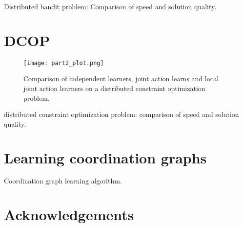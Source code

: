 \documentclass[a4paper, 12pt]{article}
\begin{document}
\begin{table*}[tp]
  \centering
  
  \caption{Distributed bandit problem: Comparison of speed and solution quality.}
  \label{tab:part1}
\end{table*}


\section{DCOP}

\begin{figure*}[tp]
  \centering
  \texttt{[image: part2\_plot.png]}
  \caption{Comparison of independent learners, joint action learns and local joint action learners on a distributed constraint optimization problem.}
  \label{fig:part2}
\end{figure*}

\begin{table*}[tp]
  \centering
  
  \caption{distributed constraint optimization problem: comparison of speed and solution quality.}
  \label{tab:part2}
\end{table*}

\section{Learning coordination graphs}

\begin{algorithm}[tph]
  \caption{Coordination graph learning algorithm.}
  \label{alg:LCG}
  \begin{algorithmic}
    
    \EndFunction
  \end{algorithmic}
\end{algorithm}





\section{Acknowledgements}

\footnotesize


\end{document}
